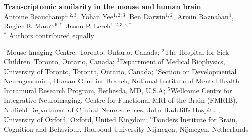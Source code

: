 
\LARGE{\textbf{Transcriptomic similarity in the mouse and human brain}}\\

\large
Antoine Beauchamp$^{1,2,3}$, Yohan Yee$^{1,2,3}$, Ben Darwin$^{1,2}$, Armin Raznahan$^{4}$, Rogier B. Mars$^{5,6,*}$, Jason P. Lerch$^{1,2,3,5, *}$\\

\small
$^{*}$ Authors contributed equally

\small
$^1$Mouse Imaging Centre, Toronto, Ontario, Canada; $^2$The Hospital for Sick Children, Toronto, Ontario, Canada; $^3$Department of Medical Biophysics, University of Toronto, Toronto, Ontario, Canada; $^4$Section on Developmental Neurogenomics, Human Genetics Branch, National Institute of Mental Health Intramural Research Program, Bethesda, MD, U.S.A; $^5$Wellcome Centre for Integrative Neuroimaging, Centre for Functional MRI of the Brain (FMRIB), Nuffield Department of Clinical Neurosciences, John Radcliffe Hospital, University of Oxford, Oxford, United Kingdom; $^6$Donders Institute for Brain, Cognition and Behaviour, Radboud University Nijmegen, Nijmegen, Netherlands

\normalsize
{}